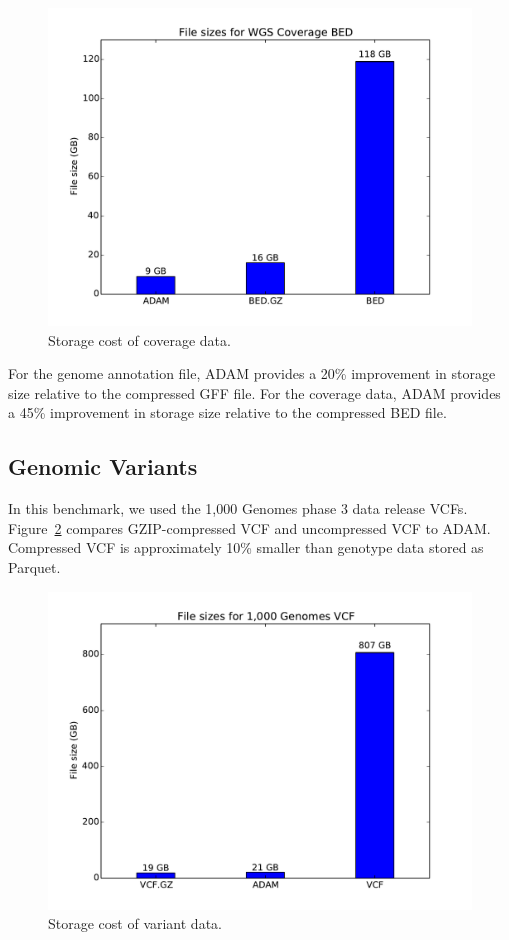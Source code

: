 \documentclass[phd]{ucbthesis}
\begin{document}
\begin{figure}[h]
  \begin{center}
    \includegraphics[width=0.5\linewidth]{graphs/bed.pdf}
  \end{center}
  \caption{Storage cost of coverage data.}
  \label{fig:coverage-storage}
\end{figure}

For the genome annotation file, ADAM provides a 20\% improvement in storage size
relative to the compressed GFF file.
For the coverage data, ADAM provides a 45\% improvement in storage size relative
to the compressed BED file.

\subsection{Genomic Variants}
\label{variant-storage}

In this benchmark, we used the 1,000 Genomes phase 3 data release VCFs.
Figure~\ref{fig:variant-storage} compares GZIP-compressed VCF and uncompressed
VCF to ADAM. Compressed VCF is approximately 10\% smaller than genotype data
stored as Parquet.

\begin{figure}[h]
  \begin{center}
    \includegraphics[width=0.5\linewidth]{graphs/vcf.pdf}
  \end{center}
  \caption{Storage cost of variant data.}
  \label{fig:variant-storage}
\end{figure}
\end{document}
